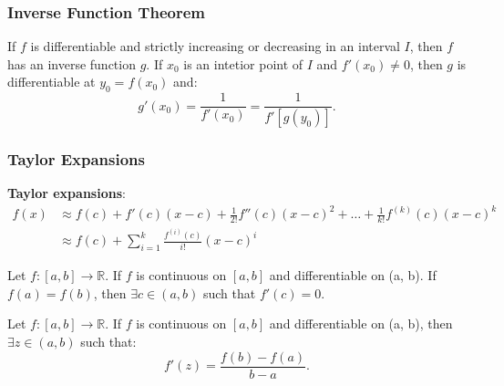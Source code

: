 \begin{example*}
\end{example*}


\subsubsection{Inverse Function Theorem}

\begin{theorem}
    If $f$ is differentiable and strictly increasing or decreasing in an interval $I$, then $f$ has an inverse function $g$. If $x_0$ is an intetior point of $I$ and $f'(x_0) \neq 0$, then $g$ is differentiable at $y_0 = f(x_0)$ and: \begin{equation*}
        g'(x_0) = \frac{1}{f'(x_0)} = \frac{1}{f'[g(y_0)]}.
    \end{equation*}
\end{theorem}

\begin{example*}
\end{example*}

\subsubsection{Taylor Expansions}

\textbf{Taylor expansions}:
\begin{align*}
    f(x) & \approx f(c) + f'(c)(x-c) + \frac{1}{2!}f''(c)(x-c)^{2} + \dots + \frac{1}{k!}f ^{(k)}(c)(x-c)^{k} \\
         & \approx f(c) + \sum_{i=1}^{k}\frac{f ^{(i)}(c)}{i!}(x-c)^{i}
\end{align*}

\begin{theorem}
    Let $f: [a, b] \to \mathbb{R}$. If $f$ is continuous on $[a, b]$ and differentiable on (a, b). If $f(a)=f(b)$, then $\exists c \in (a,b)$ such that $f'(c) = 0$.
\end{theorem}

\begin{theorem}
    Let $f: [a, b] \to \mathbb{R}$. If $f$ is continuous on $[a, b]$ and differentiable on (a, b), then $\exists z \in (a,b)$ such that:
    \begin{equation*}
        f'(z) = \frac{f(b)- f(a)}{b-a}.
    \end{equation*}
\end{theorem}

